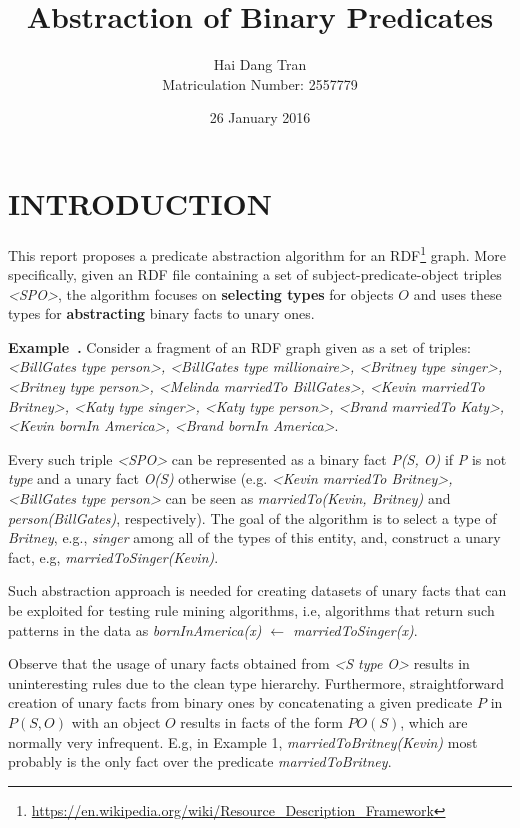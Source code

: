 \documentclass{acm_proc_article-sp}
\newcounter{example}[section]
\newenvironment{example}[1][]{\refstepcounter{example}\par\medskip
   \noindent \textbf{Example~\theexample. #1} \rmfamily}{\medskip}
\begin{document}
\title{Abstraction of Binary Predicates}
\author{
\alignauthor
Hai Dang Tran\\Matriculation Number: 2557779
}
\date{26 January 2016}

\maketitle

\section{INTRODUCTION}
This report proposes a predicate abstraction algorithm for an RDF\footnote{\url{https://en.wikipedia.org/wiki/Resource_Description_Framework}} graph. More specifically, given an RDF file containing a set of subject-predicate-object triples \textit{<SPO>}, the algorithm focuses on \textbf{selecting types} for objects $O$ and uses these types for \textbf{abstracting} binary facts to unary ones.

\begin{example}
\label{ex1}
Consider a fragment of an RDF graph given as a set of triples: \textit{<BillGates type person>, <BillGates type millionaire>, <Britney type singer>, <Britney type person>, <Melinda marriedTo BillGates>, <Kevin marriedTo Britney>, <Katy type singer>, <Katy type person>, <Brand marriedTo Katy>, <Kevin bornIn America>, <Brand bornIn America>}.
\end{example}

Every such triple \textit{<SPO>} can be represented as a binary fact \textit{P(S, O)} if \textit{P} is not \textit{type} and a unary fact \textit{O(S)} otherwise (e.g. \textit{<Kevin marriedTo Britney>, <BillGates type person>} can be seen as \textit{marriedTo(Kevin, Britney)} and \textit{person(BillGates)}, respectively). The goal of the algorithm is to select a type of \textit{Britney}, e.g., \textit{singer} among all of the types of this entity, and, construct a unary fact, e.g, \textit{marriedToSinger(Kevin)}.

Such abstraction approach is needed for creating datasets of unary facts that can be exploited for testing rule mining algorithms, i.e, algorithms that return such patterns in the data as \textit{bornInAmerica(x) $\leftarrow$ marriedToSinger(x)}.

Observe that the usage of unary facts obtained from \textit{<S type O>} results in uninteresting rules due to the clean type hierarchy. Furthermore, straightforward creation of unary facts from binary ones by concatenating a given predicate $P$ in $P(S, O)$ with an object $O$ results in facts of the form $PO(S)$, which are normally very infrequent. E.g, in Example 1, \textit{marriedToBritney(Kevin)} most probably is the only fact over the predicate \textit{marriedToBritney}.
\end{document}
